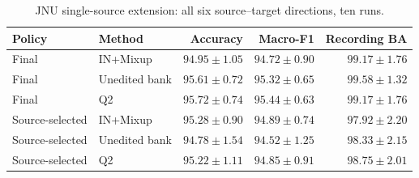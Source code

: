 \begin{table}[pos=htbp]
\centering\small
\caption{JNU single-source extension: all six source--target directions, ten runs.}
\label{tab:sdg}
\begin{tabular}{llrrr}
\toprule
Policy & Method & Accuracy & Macro-F1 & Recording BA\\
\midrule
Final & IN+Mixup & $94.95\pm1.05$ & $94.72\pm0.90$ & $99.17\pm1.76$\\
Final & Unedited bank & $95.61\pm0.72$ & $95.32\pm0.65$ & $99.58\pm1.32$\\
Final & Q2 & $95.72\pm0.74$ & $95.44\pm0.63$ & $99.17\pm1.76$\\
Source-selected & IN+Mixup & $95.28\pm0.90$ & $94.89\pm0.74$ & $97.92\pm2.20$\\
Source-selected & Unedited bank & $94.78\pm1.54$ & $94.52\pm1.25$ & $98.33\pm2.15$\\
Source-selected & Q2 & $95.22\pm1.11$ & $94.85\pm0.91$ & $98.75\pm2.01$\\
\bottomrule
\end{tabular}
\end{table}
